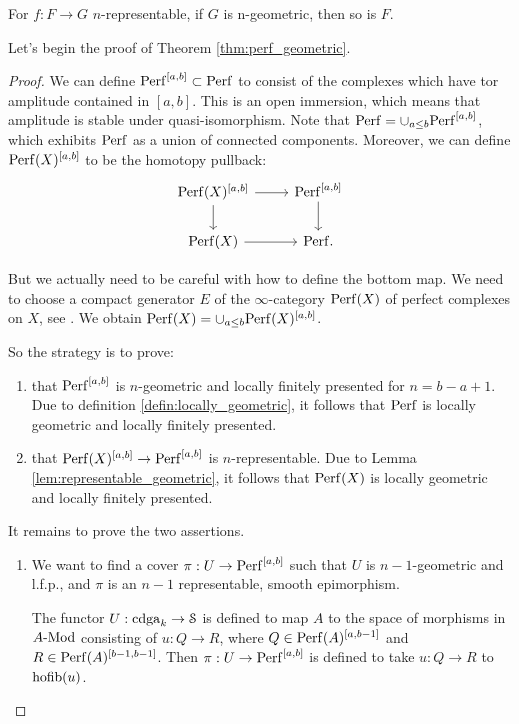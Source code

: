 \begin{lem}
\label{lem:representable_geometric}
For $f : F \to G$ $n$-representable, if $G$ is n-geometric, then so is $F$.
\end{lem}

Let's begin the proof of Theorem \ref{thm:perf_geometric}.
\begin{proof}
We can define $\mathrm{Perf}^{[a,b]} \subset \mathrm{Perf}$ to consist of the complexes which have tor amplitude contained in $[a,b]$. This
is an open immersion, which means that amplitude is stable under quasi-isomorphism.
Note that $\mathrm{Perf} = \cup_{a\leq b} \mathrm{Perf}^{[a,b]}$, which exhibits $\mathrm{Perf}$ as a union of connected components.
Moreover, we can define $\mathrm{Perf}(X)^{[a,b]}$ to be the homotopy pullback:
\[
\begin{tikzcd}
\Perf(X)^{[a,b]} \arrow{r}\arrow{d} & \Perf^{[a,b]}\arrow{d} \\
\Perf(X) \arrow{r} & \Perf .
\end{tikzcd}
\]

But we actually need to be careful with how to define the bottom map. We need to choose a compact generator $E$ of
the $\infty$-category $\mathrm{Perf}(X)$ of perfect complexes on $X$, see \cite{moduli_objects}. 
We obtain $\mathrm{Perf}(X) = \cup_{a\leq b} \mathrm{Perf}(X)^{[a,b]}$.

So the strategy is to prove:
\begin{enumerate}
\item that $\mathrm{Perf}^{[a,b]}$ is $n$-geometric and locally finitely presented for $n = b-a+1$. 
Due to definition \ref{defin:locally_geometric}, it follows that $\mathrm{Perf}$ is locally geometric and locally finitely presented.
\item that $\mathrm{Perf}(X)^{[a,b]} \to \mathrm{Perf}^{[a,b]}$ is $n$-representable. Due to Lemma \ref{lem:representable_geometric}, it follows
that $\mathrm{Perf}(X)$ is locally geometric and locally finitely presented.
\end{enumerate}

It remains to prove the two assertions.
\begin{enumerate}
\item We want to find a cover $\pi : U \to \mathrm{Perf}^{[a,b]}$ such that $U$ is $n-1$-geometric and l.f.p., and $\pi$ is an $n-1$
representable, smooth epimorphism.

The functor $U : \operatorname{cdga}_k \to \mathcal S$ is defined to map $A$ to the space of morphisms in $A\textrm{-}\mathrm{Mod}$ consisting of $u: Q \to R$, where
$Q \in \mathrm{Perf}(A)^{[a,b-1]}$ and $R \in \mathrm{Perf}(A)^{[b-1,b-1]}$. Then $\pi: U \to \mathrm{Perf}^{[a,b]}$ is defined to take
$u:Q \to R$ to $\operatorname*{hofib}(u)$.


\end{enumerate}
\end{proof}
